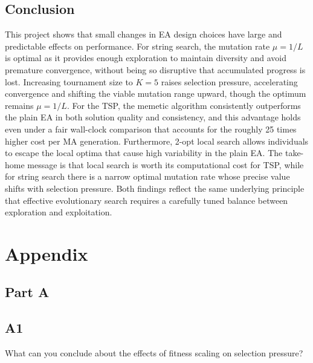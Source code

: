 \documentclass{article}
\begin{document}
\subsection*{Conclusion}
This project shows that small changes in EA design choices have large and predictable effects on performance. For string search, the mutation 
rate $\mu = 1/L$ is optimal as it provides enough exploration to maintain diversity and avoid premature convergence, without being so disruptive 
that accumulated progress is lost. Increasing tournament size to $K = 5$ raises selection pressure, accelerating convergence and shifting the 
viable mutation range upward, though the optimum remains $\mu = 1/L$. For the TSP, the memetic algorithm consistently outperforms the plain EA 
in both solution quality and consistency, and this advantage holds even under a fair wall-clock comparison that accounts for the roughly 25 times
higher cost per MA generation. Furthermore, 2-opt local search allows individuals to escape the local optima that cause high variability in the plain EA. 
The take-home message is that local search is worth its computational cost for TSP, while for string search there is a narrow optimal mutation 
rate whose precise value shifts with selection pressure. Both findings reflect the same underlying principle that effective evolutionary search 
requires a carefully tuned balance between exploration and exploitation.



\newpage
\appendix
\section*{Appendix}
\subsection*{Part A}
\subsection*{A1}
What can you conclude about the effects of fitness scaling on selection pressure?
\end{document}
